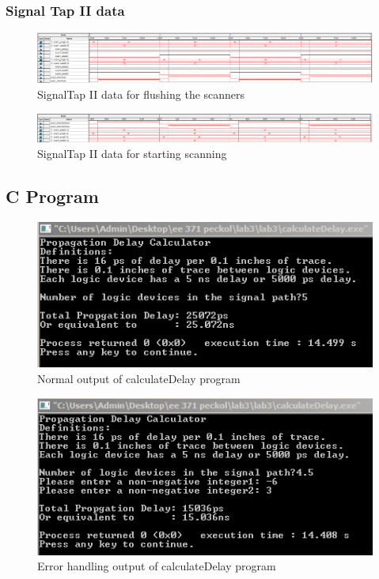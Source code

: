 \documentclass{article}
\begin{document}
    \subsubsection{Signal Tap II data}
      \begin{figure}[H]
        \centering
        \includegraphics[width=0.75\linewidth]{figures/stp/flush_stp_output.PNG}
        \caption{SignalTap II data for flushing the scanners}
        \label{fig:flush_stp}
      \end{figure}

      \begin{figure}[H]
        \centering
        \includegraphics[width=0.75\linewidth]{figures/stp/startScan_stp_output.PNG}
        \caption{SignalTap II data for starting scanning}
        \label{fig:startScan_stp}
      \end{figure}

  \subsection{C Program}
    
    

    \begin{figure}[H]
      \centering
      \includegraphics[width=0.75\linewidth]{figures/c/calc_normal.png}
      \caption{Normal output of calculateDelay program}
      \label{fig:calculateDelay_normal}
    \end{figure}

    \begin{figure}[H]
      \centering
      \includegraphics[width=0.75\linewidth]{figures/c/calc_errorhandle.png}
      \caption{Error handling output of calculateDelay program}
      \label{fig:calculateDelay_errorhandling}
    \end{figure}
\end{document}
